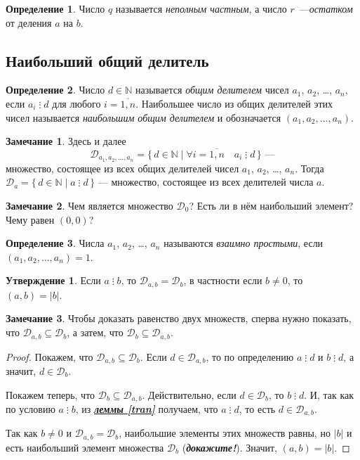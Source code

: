 \documentclass[14pt, a4paper]{extarticle}
\theoremstyle{definition}
\newtheorem*{definition}{Определение}
\newtheorem*{remark}{Замечание}
\newtheorem{statement}{Утверждение}
\newcommand{\divisible}{\mathop{\vdots}}
\begin{document}
	\begin{definition}
		Число $q$ называется \emph{неполным частным}, а число $r$~---\emph{остатком} от деления $a$ на $b$.
	\end{definition}

\subsection{Наибольший общий делитель}
\label{nod}
	
	\begin{definition}
		Число $d\in\mathbb{N}$ называется \emph{общим делителем} чисел $a_1$, $a_2$, \dots, $a_n$, если $a_i\divisible d$ для любого $i=\overline{1,n}$. Наибольшее число из общих делителей этих чисел называется \emph{наибольшим общим делителем} и обозначается $(a_1, a_2, \dots, a_n)$.
	\end{definition}

	\begin{remark}
		Здесь и далее $$\mathcal{D}_{a_1, a_2, \dots, a_n}=\{\,d\in\mathbb{N}\mid\forall i=\overline{1,n}\quad a_i\divisible d\,\}\text{ ---}$$ множество, состоящее из всех общих делителей чисел $a_1$, $a_2$, \dots, $a_n$. Тогда $\mathcal{D}_a=\{\,d\in\mathbb{N}\mid a\divisible d\,\}$ --- множество, состоящее из всех делителей числа $a$.
	\end{remark}

	\begin{remark}
		Чем является множество $\mathcal{D}_0$? Есть ли в нём наибольший элемент? Чему равен $(0,0)$?
	\end{remark}

	\begin{definition}
		Числа $a_1$, $a_2$, \dots, $a_n$ называются \emph{взаимно простыми}, если $(a_1, a_2, \dots, a_n)=1$.
	\end{definition}

	\begin{statement}
	\label{nodab}
		Если $a\divisible b$, то $\mathcal{D}_{a,b}=\mathcal{D}_b$, в частности если $b\neq0$, то $(a,b)=|b|$.
	\end{statement}
	\begin{remark}
		Чтобы доказать равенство двух множеств, сперва нужно показать, что $\mathcal{D}_{a,b}\subseteq\mathcal{D}_b$, а затем, что $\mathcal{D}_b\subseteq\mathcal{D}_{a,b}$.
	\end{remark}
	\begin{proof}
		Покажем, что $\mathcal{D}_{a,b}\subseteq\mathcal{D}_b$. Если $d\in\mathcal{D}_{a,b}$, то по определению $a\divisible d$ и $b\divisible d$, а значит, $d\in\mathcal{D}_b$.
		
		Покажем теперь, что $\mathcal{D}_b\subseteq\mathcal{D}_{a,b}$. Действительно, если $d\in\mathcal{D}_b$, то $b\divisible d$. И, так как по условию $a\divisible b$, из \hyperref[tran]{\textbf{\textit{леммы \ref*{tran}}}} получаем, что $a\divisible d$, то есть $d\in\mathcal{D}_{a,b}$.
		
		Так как $b\neq0$ и $\mathcal{D}_{a,b}=\mathcal{D}_b$, наибольшие элементы этих множеств равны, но $|b|$ и есть наибольший элемент множества $\mathcal{D}_b$ (\textbf{\textit{докажите!}}). Значит, $(a,b)=|b|$.
	\end{proof}
\end{document}
